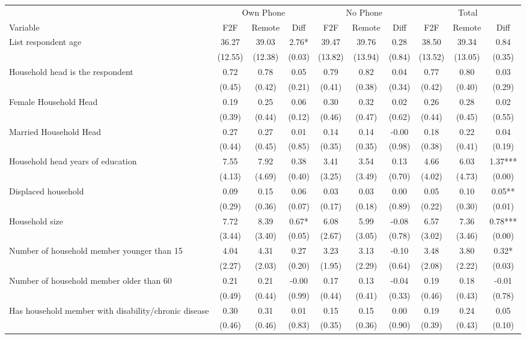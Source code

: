 \begin{tabular}{l*{9}c}
\hline\hline
 & \multicolumn{3}{c}{Own Phone} & \multicolumn{3}{c}{No Phone} & \multicolumn{3}{c}{Total}\\ 
Variable & F2F & Remote & Diff & F2F & Remote & Diff & F2F & Remote & Diff \\
\hline
List respondent age&36.27&39.03&2.76*&39.47&39.76&0.28&38.50&39.34&0.84\\
&(12.55)&(12.38)&(0.03)&(13.82)&(13.94)&(0.84)&(13.52)&(13.05)&(0.35)\\
Household head is the respondent&0.72&0.78&0.05&0.79&0.82&0.04&0.77&0.80&0.03\\
&(0.45)&(0.42)&(0.21)&(0.41)&(0.38)&(0.34)&(0.42)&(0.40)&(0.29)\\
Female Household Head&0.19&0.25&0.06&0.30&0.32&0.02&0.26&0.28&0.02\\
&(0.39)&(0.44)&(0.12)&(0.46)&(0.47)&(0.62)&(0.44)&(0.45)&(0.55)\\
Married Household Head&0.27&0.27&0.01&0.14&0.14&-0.00&0.18&0.22&0.04\\
&(0.44)&(0.45)&(0.85)&(0.35)&(0.35)&(0.98)&(0.38)&(0.41)&(0.19)\\
Household head years of education&7.55&7.92&0.38&3.41&3.54&0.13&4.66&6.03&1.37***\\
&(4.13)&(4.69)&(0.40)&(3.25)&(3.49)&(0.70)&(4.02)&(4.73)&(0.00)\\
Displaced household&0.09&0.15&0.06&0.03&0.03&0.00&0.05&0.10&0.05**\\
&(0.29)&(0.36)&(0.07)&(0.17)&(0.18)&(0.89)&(0.22)&(0.30)&(0.01)\\
Household size&7.72&8.39&0.67*&6.08&5.99&-0.08&6.57&7.36&0.78***\\
&(3.44)&(3.40)&(0.05)&(2.67)&(3.05)&(0.78)&(3.02)&(3.46)&(0.00)\\
Number of household member younger than 15&4.04&4.31&0.27&3.23&3.13&-0.10&3.48&3.80&0.32*\\
&(2.27)&(2.03)&(0.20)&(1.95)&(2.29)&(0.64)&(2.08)&(2.22)&(0.03)\\
Number of household member older than 60&0.21&0.21&-0.00&0.17&0.13&-0.04&0.19&0.18&-0.01\\
&(0.49)&(0.44)&(0.99)&(0.44)&(0.41)&(0.33)&(0.46)&(0.43)&(0.78)\\
Has household member with disability/chronic disease&0.30&0.31&0.01&0.15&0.15&0.00&0.19&0.24&0.05\\
&(0.46)&(0.46)&(0.83)&(0.35)&(0.36)&(0.90)&(0.39)&(0.43)&(0.10)\\

\end{tabular}

